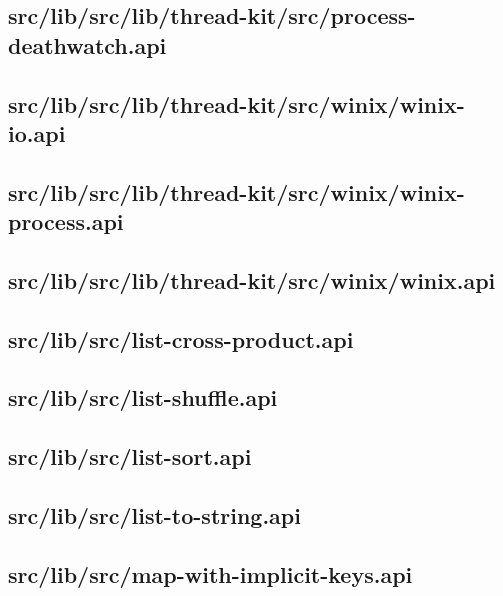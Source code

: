 \subsection{src/lib/src/lib/thread-kit/src/process-deathwatch.api}


\subsection{src/lib/src/lib/thread-kit/src/winix/winix-io.api}


\subsection{src/lib/src/lib/thread-kit/src/winix/winix-process.api}


\subsection{src/lib/src/lib/thread-kit/src/winix/winix.api}


\subsection{src/lib/src/list-cross-product.api}


\subsection{src/lib/src/list-shuffle.api}


\subsection{src/lib/src/list-sort.api}


\subsection{src/lib/src/list-to-string.api}


\subsection{src/lib/src/map-with-implicit-keys.api}


